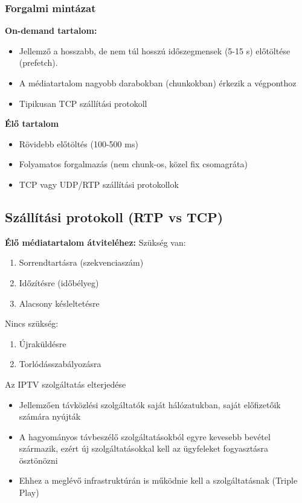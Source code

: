 \documentclass[10pt,a4paper]{article}
\begin{document}
\subsubsection{Forgalmi mintázat}
\textbf{On-demand tartalom:}
\begin{itemize}
	\item Jellemző a hosszabb, de nem túl hosszú
	időszegmensek (5-15 s) előtöltése (prefetch).
	\item A médiatartalom nagyobb darabokban (chunkokban) érkezik a végponthoz
	\item Tipikusan TCP szállítási protokoll
\end{itemize}
	\textbf{Élő tartalom}
	\begin{itemize}
		\item Rövidebb előtöltés (100-500 ms)
		\item Folyamatos forgalmazás (nem chunk-os, közel
		fix csomagráta)
		\item TCP vagy UDP/RTP szállítási protokollok
	\end{itemize}
\subsection{Szállítási protokoll (RTP vs TCP)}
	\textbf{Élő médiatartalom átviteléhez:}
Szükség van:
	\begin{enumerate}
		\item Sorrendtartásra (szekvenciaszám)
		\item Időzítésre (időbélyeg)
		\item Alacsony késleltetésre
	\end{enumerate}
Nincs szükség:
	\begin{enumerate}
		\item Újraküldésre
		\item Torlódásszabályozásra
	\end{enumerate}
Az IPTV szolgáltatás elterjedése
\begin{itemize}
	\item Jellemzően távközlési szolgáltatók saját
	hálózatukban, saját előfizetőik számára nyújták
	\item A hagyományos távbeszélő szolgáltatásokból
	egyre kevesebb bevétel származik, ezért új
	szolgáltatásokkal kell az ügyfeleket fogyasztásra
	ösztönözni
	\item Ehhez a meglévő infrastruktúrán is működnie
	kell a szolgáltatásnak (Triple Play)
\end{itemize}
\end{document}
